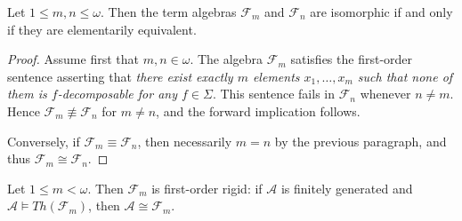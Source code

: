 \documentclass[a4paper,11pt]{article}
\newcommand{\cspace}{~}
\begin{document}
\begin{proposition}\label{prop:term-algebras-iso-elem}
Let $1\leq m,n\leq\omega$. Then the term algebras $\mathcal{F}_m$ and $\mathcal{F}_n$ are isomorphic if and only if they are elementarily equivalent.
\end{proposition}

\begin{proof}
Assume first that $m,n\in\omega$. The algebra $\mathcal{F}_m$ satisfies the first-order sentence asserting that \emph{there exist exactly $m$ elements $x_1,\ldots,x_m$ such that none of them is $f$-decomposable for any $f\in\Sigma$}. This sentence fails in $\mathcal{F}_n$ whenever $n\neq m$. Hence $\mathcal{F}_m\not\equiv\mathcal{F}_n$ for $m\neq n$, and the forward implication follows.

Conversely, if $\mathcal{F}_m\equiv\mathcal{F}_n$, then necessarily $m=n$ by the previous paragraph, and thus $\mathcal{F}_m\cong\mathcal{F}_n$.
\end{proof}

\begin{corollary}\label{rigid}
Let $1\leq m<\omega$. Then $\mathcal{F}_m$ is first-order rigid: if $\mathcal{A}$ is finitely generated and $\mathcal{A}\models Th(\mathcal{F}_m)$, then $\mathcal{A}\cong\mathcal{F}_m$.
\end{corollary}
   

\end{document}
